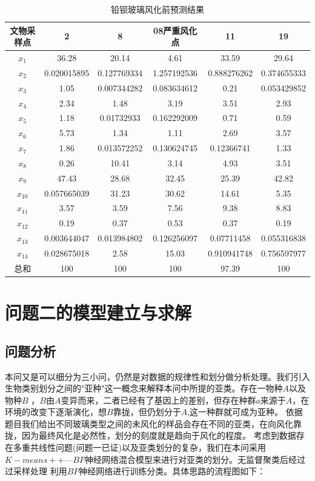 \documentclass[UTF8]{ctexart}
\begin{document}
\begin{table}[H]
    \centering
	\caption{铅钡玻璃风化前预测结果}
    \begin{tabular}{|c|c|c|c|c|c|}
    \hline
        文物采样点 & 2 & 8 & 08严重风化点 & 11 & 19  \\ \hline
        $x_1$ & 36.28 & 20.14 & 4.61 & 33.59 & 29.64  \\ \hline
		$x_2$ & 0.020015895 & 0.127769334 & 1.257192536 & 0.888276262 & 0.374655333 \\ \hline
        $x_3$ & 1.05 & 0.007344282 & 0.083634612 & 0.21 & 0.053429852  \\ \hline
        $x_4$ & 2.34 & 1.48 & 3.19 & 3.51 & 2.93 \\ \hline
        $x_5$ & 1.18 & 0.01732933 & 0.162292009 & 0.71 & 0.59 \\ \hline
        $x_6$ & 5.73 & 1.34 & 1.11 & 2.69 & 3.57 \\ \hline
        $x_7$ & 1.86 & 0.013572252 & 0.130624745 & 0.12366741 & 1.33 \\ \hline
        $x_8$ & 0.26 & 10.41 & 3.14 & 4.93 & 3.51 \\ \hline
        $x_9$ & 47.43 & 28.68 & 32.45 & 25.39 & 42.82  \\ \hline
        $x_{10}$ & 0.057665039 & 31.23 & 30.62 & 14.61 & 5.35 \\ \hline
        $x_{11}$ & 3.57 & 3.59 & 7.56 & 9.38 & 8.83  \\ \hline
        $x_{12}$ & 0.19 & 0.37 & 0.53 & 0.37 & 0.19 \\ \hline
		$x_{13}$ & 0.003644047 & 0.013984802 & 0.126256097 & 0.07711458 & 0.055316838  \\ \hline
        $x_{14}$ & 0.028675018 & 2.58 & 15.03 & 0.910941748 & 0.756597977  \\ \hline
        总和 & 100 & 100 & 100 & 97.39 & 100 \\ \hline
    \end{tabular}
\end{table}









\section{问题二的模型建立与求解}
\subsection{问题分析}
本问又是可以细分为三小问，仍然是对数据的规律性和划分做分析处理。我们引入生物类别划分之间的"亚种"这一概念来解释本问中所提的亚类。存在一物种$A$以及物种$B$
，$B$由$A$变异而来，二者已经有了基因上的差别，但存在种群$a$来源于$A$，在环境的改变下逐渐演化，想$B$靠拢，但仍划分于$A$,这一种群就可成为亚种。
依据题目我们给出不同玻璃类型之间的未风化的样品会存在不同的亚类，在向风化靠拢，因为最终风化是必然性，划分的刻度就是趋向于风化的程度。
考虑到数据存在多重共线性问题(问题一已证)以及亚类划分的复杂，我们在本问采用$K-means++$—$BP$神经网络混合模型来进行对亚类的划分。无监督聚类后经过过采样处理
利用$BP$神经网络进行训练分类。具体思路的流程图如下：
\end{document}
